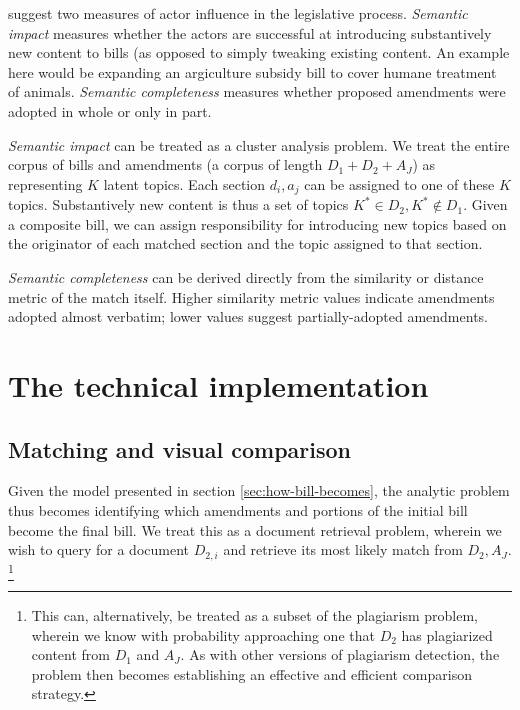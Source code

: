 \documentclass[11pt]{article}
\begin{document}
\cite{tsebelis2001legislative} suggest two measures of actor influence
in the legislative process. \textit{Semantic impact} measures whether
the actors are successful at introducing substantively new content to
bills (as opposed to simply tweaking existing content. An example here
would be expanding an argiculture subsidy bill to cover humane
treatment of animals. \textit{Semantic completeness} measures whether
proposed amendments were adopted in whole or only in part. 

\textit{Semantic impact} can be treated as a cluster analysis
problem. We treat the entire corpus of bills and amendments (a corpus
of length $D_1 + D_2 + A_J$) as representing $K$ latent topics. Each
section $d_i, a_j$ can be assigned to one of these $K$
topics. Substantively new content is thus a set of topics $K^* \in
D_2, K^* \not \in D_1$. Given a composite bill, we can assign
responsibility for introducing new topics based on the originator of
each matched section and the topic assigned to that section. 

\textit{Semantic completeness} can be derived directly from the
similarity or distance metric of the match itself. Higher similarity
metric values indicate amendments adopted almost verbatim; lower
values suggest partially-adopted amendments. 

\section{The technical implementation}
\label{sec:legisl-sect-match}



\subsection{Matching and visual comparison}
\label{sec:match-visu-comp}

Given the model presented in section \ref{sec:how-bill-becomes}, the
analytic problem thus becomes identifying which amendments and
portions of the initial bill become the final bill. We treat this as a
document retrieval problem, wherein we wish to query for a document
$D_{2,i}$ and retrieve its most likely match from $D_2,
A_J$. \footnote{This can, alternatively, be treated as a
subset of the plagiarism problem, wherein we know with probability
approaching one that $D_2$ has plagiarized content from $D_1$ and
$A_J$. As with other versions of plagiarism detection, the problem
then becomes establishing an effective and efficient comparison
strategy.}
\end{document}
